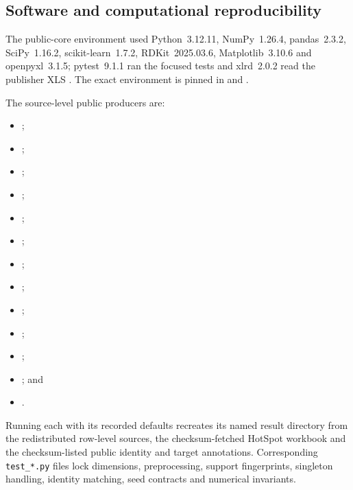 \subsection{Software and computational reproducibility}

The public-core environment used Python~3.12.11, NumPy~1.26.4,
pandas~2.3.2, SciPy~1.16.2, scikit-learn~1.7.2, RDKit~2025.03.6,
Matplotlib~3.10.6 and openpyxl~3.1.5; pytest~9.1.1 ran the focused tests
and xlrd~2.0.2 read the publisher XLS
\cite{numpy2020,scipy2020,rdkit2025,matplotlib2007}.  The exact environment is
pinned in  and .

The source-level public producers are:
\begin{itemize}
\item {};
\item {};
\item {};
\item {};
\item {};
\item {};
\item {};
\item {};
\item {};
\item {};
\item {};
\item {}; and
\item {}.
\end{itemize}
Running each with its recorded defaults recreates its named result directory
from the redistributed row-level sources, the checksum-fetched HotSpot workbook
and the checksum-listed public identity and target annotations. Corresponding
\texttt{test\_*.py} files lock dimensions, preprocessing, support fingerprints,
singleton handling, identity matching, seed contracts and numerical invariants.

